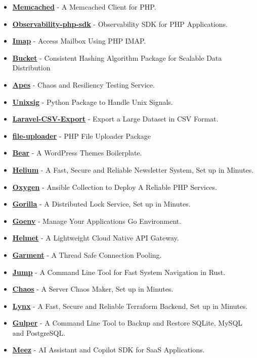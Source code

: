 \documentclass[paper=a4,fontsize=11pt]{scrartcl} %
\begin{document}
\begin{itemize}
\item \textbf{\href{https://github.com/Clivern/Memcached}{Memcached}} - A Memcached Client for PHP.
\item \textbf{\href{https://github.com/Clivern/Observability-php-sdk}{Observability-php-sdk}} - Observability SDK for PHP Applications.
\item \textbf{\href{https://github.com/Clivern/Imap}{Imap}} - Access Mailbox Using PHP IMAP.
\item \textbf{\href{https://github.com/Clivern/Bucket}{Bucket}} - Consistent Hashing Algorithm Package for Scalable Data Distribution
\item \textbf{\href{https://github.com/Clivern/Apes}{Apes}} - Chaos and Resiliency Testing Service.
\item \textbf{\href{https://github.com/Clivern/Unixsig}{Unixsig}} - Python Package to Handle Unix Signals.
\item \textbf{\href{https://github.com/Clivern/Laravel-CSV-Export}{Laravel-CSV-Export}} - Export a Large Dataset in CSV Format.
\item \textbf{\href{https://github.com/Clivern/file_uploader}{file-uploader}} - PHP File Uploader Package
\item \textbf{\href{https://github.com/Clivern/Bear}{Bear}} - A WordPress Themes Boilerplate.
\item \textbf{\href{https://github.com/Clivernio/Helium}{Helium}} - A Fast, Secure and Reliable Newsletter System, Set up in Minutes.
\item \textbf{\href{https://github.com/Clivern/Oxygen}{Oxygen}} - Ansible Collection to Deploy A Reliable PHP Services.
\item \textbf{\href{https://github.com/Norwik/Gorilla}{Gorilla}} - A Distributed Lock Service, Set up in Minutes.
\item \textbf{\href{https://github.com/Clivern/Goenv}{Goenv}} - Manage Your Applications Go Environment.
\item \textbf{\href{https://github.com/Norwik/Helmet}{Helmet}} - A Lightweight Cloud Native API Gateway.
\item \textbf{\href{https://github.com/Norwik/Garment}{Garment}} - A Thread Safe Connection Pooling.
\item \textbf{\href{https://github.com/Clivern/Jump}{Jump}} - A Command Line Tool for Fast System Navigation in Rust.
\item \textbf{\href{https://github.com/Clivern/Chaos}{Chaos}} - A Server Chaos Maker, Set up in Minutes.
\item \textbf{\href{https://github.com/Clivern/Lynx}{Lynx}} - A Fast, Secure and Reliable Terraform Backend, Set up in Minutes.
\item \textbf{\href{https://github.com/Clivern/Gulper}{Gulper}} - A Command Line Tool to Backup and Restore SQLite, MySQL and PostgreSQL.
\item \textbf{\href{https://github.com/Clivern/Meez}{Meez}} - AI Assistant and Copilot SDK for SaaS Applications.
\end{itemize}
\end{document}
